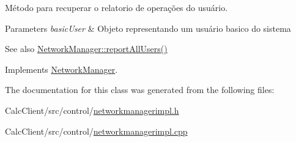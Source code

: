 Método para recuperar o relatorio de operações do usuário. 


\begin{DoxyParams}{Parameters}
{\em basic\+User} & Objeto representando um usuário basico do sistema \\
\hline
\end{DoxyParams}
\begin{DoxySeeAlso}{See also}
\hyperlink{classNetworkManager_adc90f12e3f926a79382aefbceb3aecfc}{Network\+Manager\+::report\+All\+Users()} 
\end{DoxySeeAlso}


Implements \hyperlink{classNetworkManager_a2a1c3b3d0bc298a621820e723e3141af}{Network\+Manager}.



The documentation for this class was generated from the following files\+:\begin{DoxyCompactItemize}
\item 
Calc\+Client/src/control/\hyperlink{networkmanagerimpl_8h}{networkmanagerimpl.\+h}\item 
Calc\+Client/src/control/\hyperlink{networkmanagerimpl_8cpp}{networkmanagerimpl.\+cpp}\end{DoxyCompactItemize}
